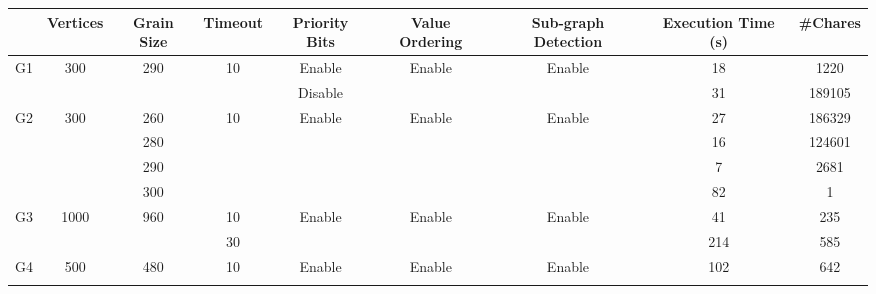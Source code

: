 \documentclass[10pt,oneside]{article}
\begin{document}
\begin{table}[h]
  \scalebox{0.8} {
    \begin{tabular}{|c|c|c|c|c|c|c|c|c|}
    \hline
                        & Vertices              & Grain Size           & Timeout             & Priority Bits           & Value Ordering          & Sub-graph Detection     & Execution Time (s) & \#Chares \\ \hline
    \multirow{2}{*}{G1} & \multirow{2}{*}{300}  & \multirow{2}{*}{290} & \multirow{2}{*}{10} & Enable                  & \multirow{2}{*}{Enable} & \multirow{2}{*}{Enable} & 18                 & 1220     \\ \cline{5-5} \cline{8-9} 
                        &                       &                      &                     & Disable                 &                         &                         & 31                 & 189105   \\ \hline
    \multirow{4}{*}{G2} & \multirow{4}{*}{300}  & 260                  & \multirow{4}{*}{10} & \multirow{4}{*}{Enable} & \multirow{4}{*}{Enable}       & \multirow{4}{*}{Enable}       & 27                 & 186329   \\ \cline{3-3} \cline{8-9} 
                        &                       & 280                  &                     &                         &                         &                         & 16                 & 124601   \\ \cline{3-3} \cline{8-9} 
                        &                       & 290                  &                     &                         &                         &                         & 7                  & 2681     \\ \cline{3-3} \cline{8-9} 
                        &                       & 300                  &                     &                         &                         &                         & 82                 & 1        \\ \hline
    \multirow{2}{*}{G3} & \multirow{2}{*}{1000} & \multirow{2}{*}{960} & 10                  & \multirow{2}{*}{Enable} & \multirow{2}{*}{Enable} & \multirow{2}{*}{Enable} & 41                 & 235      \\ \cline{4-4} \cline{8-9} 
                        &                       &                      & 30                  &                         &                         &                         & 214                & 585      \\ \hline
    \multirow{2}{*}{G4} & \multirow{2}{*}{500}  & \multirow{2}{*}{480} & \multirow{2}{*}{10} & \multirow{2}{*}{Enable} & Enable                  & \multirow{2}{*}{Enable} & 102                & 642      \\ \cline{6-6} \cline{8-9} 

\end{tabular}}
\end{table}
\end{document}

